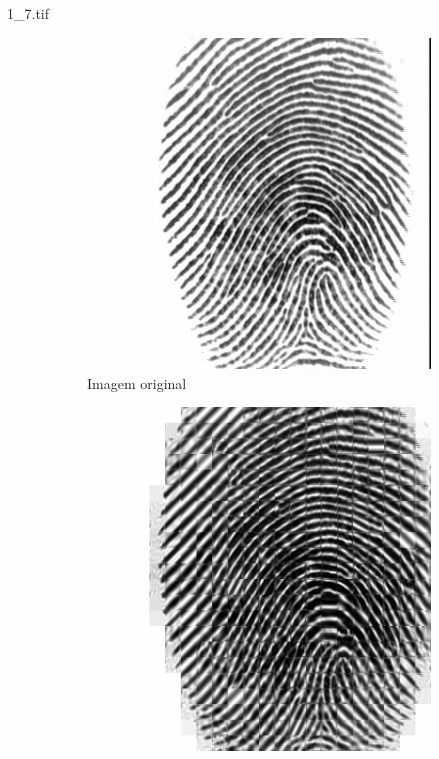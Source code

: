 \documentclass{beamer}
\begin{document}
    \begin{frame}{1\_7.tif}
        \begin{figure}
            \centering
            \begin{subfigure}[!ht]{0.32\textwidth}
                \includegraphics[width=\columnwidth]{Fingerprints/1_7.jpg}
                \caption{Imagem original}
            \end{subfigure}
            \begin{subfigure}[!ht]{0.32\textwidth}
                \includegraphics[width=\columnwidth]{Fingerprints/1_7_intermediate.jpg}

\end{subfigure}
\end{figure}
\end{frame}
\end{document}

